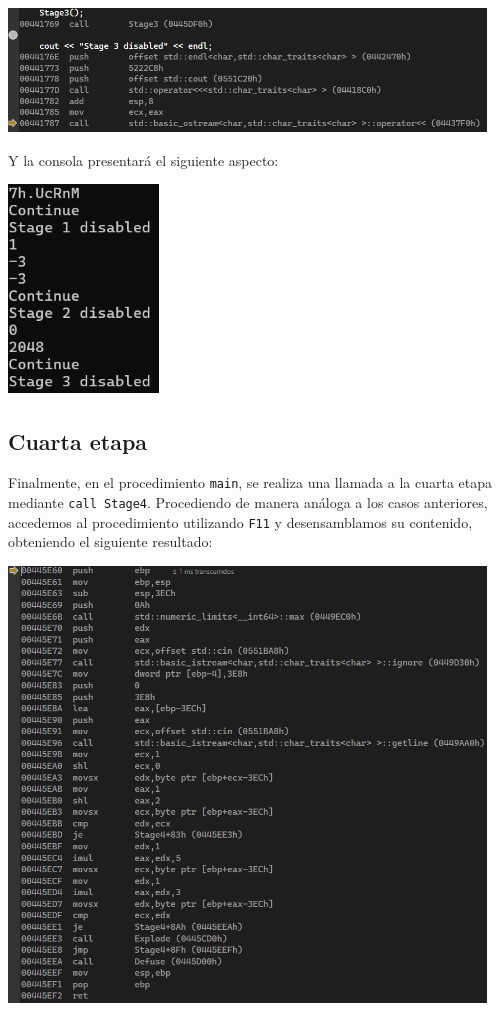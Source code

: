 \documentclass[11pt,a4paper]{article}
\begin{document}
\begin{center}
\includegraphics[width=0.95\textwidth]{s3-2.png}
\end{center}
\noindent Y la consola presentará el siguiente aspecto:
\begin{center}
\includegraphics[width=0.3\textwidth]{s3-3.png}
\end{center}
\vspace{3ex}

\subsection{Cuarta etapa}

Finalmente, en el procedimiento \texttt{main}, se realiza una llamada a la cuarta etapa mediante \texttt{call Stage4}. Procediendo de manera análoga a los casos anteriores, accedemos al procedimiento utilizando \texttt{F11} y desensamblamos su contenido, obteniendo el siguiente resultado:

\begin{center}
\includegraphics[width=0.95\textwidth]{s4-1.png}
\end{center}
\vspace{1ex}
\end{document}
